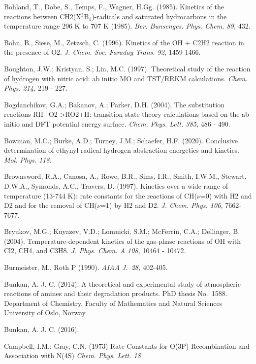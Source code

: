\documentclass[12pt,landscape]{article}
\newcounter{reaction}
\begin{document}
Bohland, T., Dobe, S., Temps, F., Wagner, H.Gg. (1985).  Kinetics of the reactions between CH2(X$^3$B$_1$)-radicals and saturated hydrocarbons in the temperature range 296 K to 707 K (1985). {\em Ber. Bunsenges. Phys. Chem. 89,} 432.

Bohn, B., Siese, M., Zetzsch, C. (1996). Kinetics of the OH + C2H2 reaction in the presence of O2. {\em J. Chem. Soc. Faraday Trans. 92,} 1459-1466.

  Boughton, J.W.; Kristyan, S.; Lin, M.C. (1997).  Theoretical study of the reaction of hydrogen with nitric acid: ab initio MO and TST/RRKM calculations. {\em Chem. Phys. 214,} 219 - 227.

Bogdanchikov, G.A.; Bakanov, A.; Parker, D.H. (2004), The substitution reactions RH+O2->RO2+H: transition state theory calculations based on the ab initio and DFT potential energy surface.  {\em Chem. Phys. Lett. 385,} 486 - 490.

Bowman, M.C.; Burke, A.D.; Turney, J.M.; Schaefer, H.F. (2020).
Conclusive determination of ethynyl radical hydrogen abstraction energetics and kinetics.
{\em  Mol. Phys. 118.}

Brownsword, R.A., Canosa, A., Rowe, B.R., Sims, I.R., Smith, I.W.M., Stewart, D.W.A., Symonds, A.C., Travers, D. (1997). Kinetics over a wide range of temperature (13-744 K): rate constants for the reactions of CH($\nu$=$0$) with H2 and D2 and for the removal of CH($\nu$=$1$) by H2 and D2. {\em J. Chem. Phys. 106,} 7662-7677.

Bryukov, M.G.; Knyazev, V.D.; Lomnicki, S.M.; McFerrin, C.A.; Dellinger, B. (2004).  Temperature-dependent kinetics of the gas-phase reactions of OH with Cl2, CH4, and C3H8. {\em J. Phys. Chem. A 108,} 10464 - 10472.

Burmeister, M., Roth P (1990).  {\em AIAA J.\  28,} 402-405.

Bunkan, A. J. C. (2014).
A theoretical and experimental study of atmospheric reactions of amines and their degradation products.
PhD thesis No.\ 1588.
Department of Chemistry, Faculty of Mathematics and Natural Sciences University of Oslo, Norway.

Bunkan, A. J. C. (2016).

Campbell, I.M.; Gray, C.N. (1973)
Rate Constants for O(3P) Recombination and Association with N(4S)
{\em Chem. Phys. Lett. 18}
\end{document}

